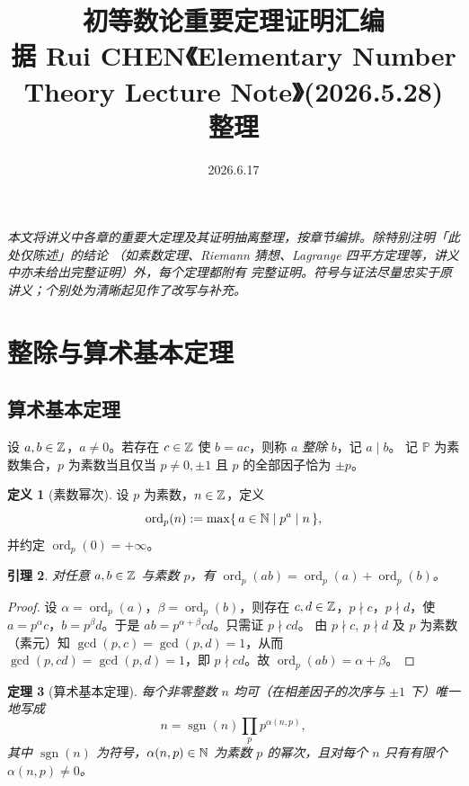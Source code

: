 \documentclass{article}
\title{\textbf{初等数论重要定理证明汇编}\\[4pt]
\large 据 Rui CHEN《Elementary Number Theory Lecture Note》(2026.5.28) 整理}
\author{}
\date{2026.6.17}
\newcommand{\ord}{\operatorname{ord}}
\newcommand{\Prim}{\mathbb{P}}
\newcommand{\sgn}{\operatorname{sgn}}
\theoremstyle{plain}
\newtheorem{thm}{定理}[section]
\newtheorem{lem}[thm]{引理}
\theoremstyle{definition}
\newtheorem{defn}[thm]{定义}
\theoremstyle{remark}
\begin{document}
\maketitle

\begin{center}
  \itshape
  本文将讲义中各章的重要大定理及其证明抽离整理，按章节编排。除特别注明「此处仅陈述」的结论
  （如素数定理、Riemann 猜想、Lagrange 四平方定理等，讲义中亦未给出完整证明）外，每个定理都附有
  完整证明。符号与证法尽量忠实于原讲义；个别处为清晰起见作了改写与补充。
\end{center}

\bigskip
\tableofcontents
\bigskip

\section{整除与算术基本定理}

\subsection{算术基本定理}

设 $a,b\in\mathbb{Z}$，$a\ne 0$。若存在 $c\in\mathbb{Z}$ 使 $b=ac$，则称 $a$ \emph{整除} $b$，记 $a\mid b$。
记 $\Prim$ 为素数集合，$p$ 为素数当且仅当 $p\ne0,\pm1$ 且 $p$ 的全部因子恰为 $\pm p$。

\begin{defn}[素数幂次]
  设 $p$ 为素数，$n\in\mathbb{Z}$，定义
  \[
    \ord_p(n):=\max\{\,a\in\N\mid p^a\mid n\,\},
  \]
  并约定 $\ord_p(0)=+\infty$。
\end{defn}

\begin{lem}\label{lem:ord-mul}
  对任意 $a,b\in\mathbb{Z}$ 与素数 $p$，有 $\ord_p(ab)=\ord_p(a)+\ord_p(b)$。
\end{lem}

\begin{proof}
  设 $\alpha=\ord_p(a)$，$\beta=\ord_p(b)$，则存在 $c,d\in\mathbb{Z}$，$p\nmid c$，$p\nmid d$，使
  $a=p^\alpha c$，$b=p^\beta d$。于是 $ab=p^{\alpha+\beta}cd$。只需证 $p\nmid cd$。
  由 $p\nmid c,\ p\nmid d$ 及 $p$ 为素数（素元）知 $\gcd(p,c)=\gcd(p,d)=1$，从而 $\gcd(p,cd)=\gcd(p,d)=1$，即 $p\nmid cd$。故 $\ord_p(ab)=\alpha+\beta$。
\end{proof}

\begin{thm}[算术基本定理]\label{thm:FTA}
  每个非零整数 $n$ 均可（在相差因子的次序与 $\pm1$ 下）唯一地写成
  \[
    n=\sgn(n)\prod_{p}p^{\alpha(n,p)},
  \]
  其中 $\sgn(n)$ 为符号，$\alpha(n,p)\in\mathbb{N}$ 为素数 $p$ 的幂次，且对每个 $n$ 只有有限个 $\alpha(n,p)\ne0$。
\end{thm}
\end{document}
